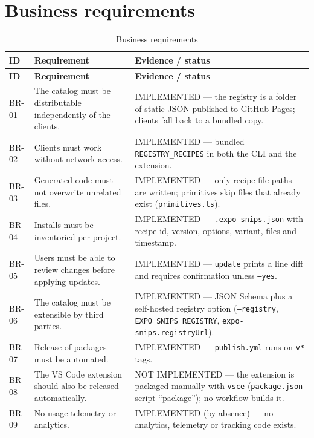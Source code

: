 \section{Business requirements}

\begin{longtable}{@{}L{1.6cm}L{5.4cm}L{7.4cm}@{}}
\caption{Business requirements}\\
\toprule
\textbf{ID} & \textbf{Requirement} & \textbf{Evidence / status} \\
\midrule
\endfirsthead
\toprule
\textbf{ID} & \textbf{Requirement} & \textbf{Evidence / status} \\
\midrule
\endhead
BR-01 & The catalog must be distributable independently of the clients. & IMPLEMENTED --- the registry is a folder of static JSON published to GitHub Pages; clients fall back to a bundled copy. \\
BR-02 & Clients must work without network access. & IMPLEMENTED --- bundled \texttt{REGISTRY\_RECIPES} in both the CLI and the extension. \\
BR-03 & Generated code must not overwrite unrelated files. & IMPLEMENTED --- only recipe file paths are written; primitives skip files that already exist (\texttt{primitives.ts}). \\
BR-04 & Installs must be inventoried per project. & IMPLEMENTED --- \texttt{.expo-snips.json} with recipe id, version, options, variant, files and timestamp. \\
BR-05 & Users must be able to review changes before applying updates. & IMPLEMENTED --- \texttt{update} prints a line diff and requires confirmation unless \texttt{--yes}. \\
BR-06 & The catalog must be extensible by third parties. & IMPLEMENTED --- JSON Schema plus a self-hosted registry option (\texttt{--registry}, \texttt{EXPO\_SNIPS\_REGISTRY}, \texttt{expo-snips.registryUrl}). \\
BR-07 & Release of packages must be automated. & IMPLEMENTED --- \texttt{publish.yml} runs on \texttt{v*} tags. \\
BR-08 & The VS Code extension should also be released automatically. & NOT IMPLEMENTED --- the extension is packaged manually with \texttt{vsce} (\texttt{package.json} script ``package''); no workflow builds it. \\
BR-09 & No usage telemetry or analytics. & IMPLEMENTED (by absence) --- no analytics, telemetry or tracking code exists. \\
\bottomrule
\end{longtable}

